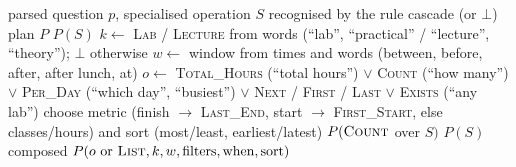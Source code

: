 \begin{algorithm}[H]
\caption{Build a query plan from the parsed question}\label{alg:plan}
\begin{algorithmic}[1]
\Require parsed question $p$, specialised operation $S$ recognised by the rule cascade (or $\bot$)
\Ensure plan $P$
 \Return $P(S)$ \EndIf
\State $k \gets$ \textsc{Lab} / \textsc{Lecture} from words (``lab'', ``practical'' / ``lecture'', ``theory''); $\bot$ otherwise
\State $w \gets$ window from times and words (between, before, after, after lunch, at)
\State $o \gets$ \textsc{Total\_Hours} (``total hours'') $\vee$ \textsc{Count} (``how many'') $\vee$ \textsc{Per\_Day} (``which day'', ``busiest'') $\vee$ \textsc{Next} / \textsc{First} / \textsc{Last} $\vee$ \textsc{Exists} (``any lab'')
 choose metric (finish $\rightarrow$ \textsc{Last\_End}, start $\rightarrow$ \textsc{First\_Start}, else classes/hours) and sort (most/least, earliest/latest) \EndIf
{} \Return $P(\textsc{Count}$ over $S)$ \EndIf
{} \Return $P(S)$  \EndIf
\State \Return composed $P(o \text{ or } \textsc{List}, k, w, \text{filters}, \text{when}, \text{sort})$
\end{algorithmic}
\end{algorithm}
